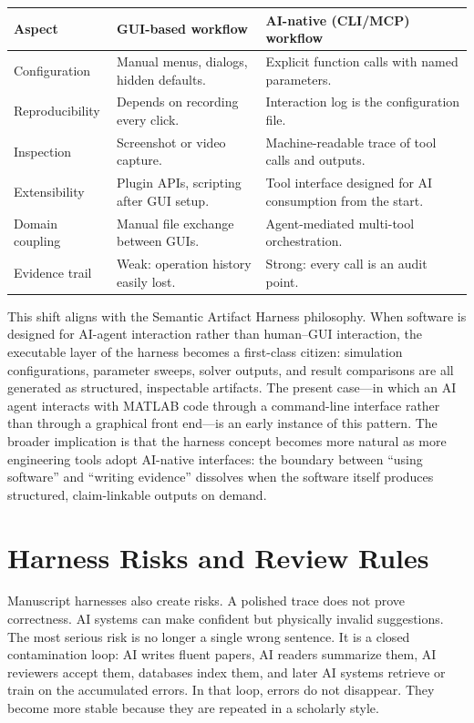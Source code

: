 \documentclass{article}
\begin{document}
\begin{tcolorbox}[colback=gray!3!white,colframe=gray!60!black,title=Software Interaction Paradigm Shift,arc=4mm,boxrule=1pt]
\small
\setlength{\tabcolsep}{3pt}
\begin{tabular}{p{2.8cm}p{4.5cm}p{5.5cm}}
\toprule
\textbf{Aspect} & \textbf{GUI-based workflow} & \textbf{AI-native (CLI/MCP) workflow} \\
\midrule
Configuration & Manual menus, dialogs, hidden defaults. & Explicit function calls with named parameters. \\
Reproducibility & Depends on recording every click. & Interaction log is the configuration file. \\
Inspection & Screenshot or video capture. & Machine-readable trace of tool calls and outputs. \\
Extensibility & Plugin APIs, scripting after GUI setup. & Tool interface designed for AI consumption from the start. \\
Domain coupling & Manual file exchange between GUIs. & Agent-mediated multi-tool orchestration. \\
Evidence trail & Weak: operation history easily lost. & Strong: every call is an audit point. \\
\bottomrule
\end{tabular}
\end{tcolorbox}

This shift aligns with the Semantic Artifact Harness philosophy. When software is designed for AI-agent interaction rather than human--GUI interaction, the executable layer of the harness becomes a first-class citizen: simulation configurations, parameter sweeps, solver outputs, and result comparisons are all generated as structured, inspectable artifacts. The present case---in which an AI agent interacts with MATLAB code through a command-line interface rather than through a graphical front end---is an early instance of this pattern. The broader implication is that the harness concept becomes more natural as more engineering tools adopt AI-native interfaces: the boundary between ``using software'' and ``writing evidence'' dissolves when the software itself produces structured, claim-linkable outputs on demand.

\section{Harness Risks and Review Rules}

Manuscript harnesses also create risks. A polished trace does not prove correctness. AI systems can make confident but physically invalid suggestions. The most serious risk is no longer a single wrong sentence. It is a closed contamination loop: AI writes fluent papers, AI readers summarize them, AI reviewers accept them, databases index them, and later AI systems retrieve or train on the accumulated errors. In that loop, errors do not disappear. They become more stable because they are repeated in a scholarly style.
\end{document}
